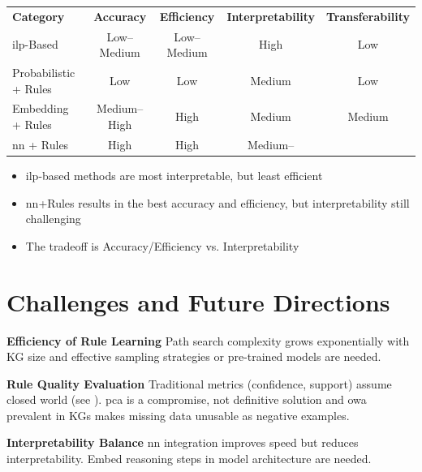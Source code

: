 \begin{mytable}
    \begin{tabular}{lcccc}
        \textbf{Category} & \textbf{Accuracy} & \textbf{Efficiency} & \textbf{Interpretability} & \textbf{Transferability} \\

        \gls{ilp}-Based &
        Low--Medium &
        Low--Medium &
            {\color{oceanmist}High} &
        Low \\

        Probabilistic + Rules &
        Low &
        Low &
        Medium &
        Low \\

        Embedding + Rules &
        Medium--{\color{oceanmist}High} &
            {\color{oceanmist}High} &
        Medium &
        Medium \\

        \gls{nn} + Rules &
            {\color{oceanmist}High} &
            {\color{oceanmist}High} &        Medium--{\color{oceanmist}} &            {\color{oceanmist}} \\
    \end{tabular}
    \caption{Comparative Analysis Summary.}
    \label{tab:kgr_comparison}
\end{mytable}

\begin{keyin}
    \begin{itemize}
        \item \gls{ilp}-based methods are most interpretable, but least efficient
        \item \gls{nn}+Rules results in the best accuracy and efficiency, but interpretability still challenging
        \item The tradeoff is Accuracy/Efficiency vs.
        Interpretability
    \end{itemize}
\end{keyin}

\section{Challenges and Future Directions}\label{sec:challenges-and-future-directions}
\begin{challenge}
    \textbf{Efficiency of Rule Learning} Path search complexity grows exponentially with KG size and effective
    sampling strategies or pre-trained models are needed.
\end{challenge}
\begin{challenge}
    \textbf{Rule Quality Evaluation} Traditional metrics (confidence, support) assume closed world (see ). \gls{pca} is a compromise, not definitive solution and \gls{owa} prevalent in KGs makes missing data unusable
    as negative examples.
\end{challenge}
\begin{challenge}
    \textbf{Interpretability Balance} \gls{nn} integration improves speed but reduces interpretability.
    Embed
    reasoning steps in model architecture are needed.
\end{challenge}

